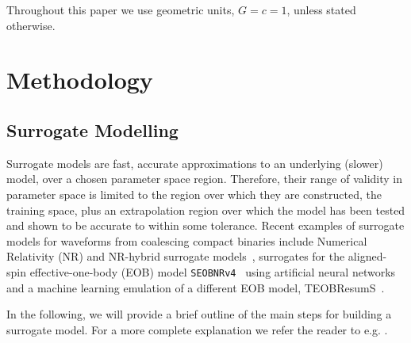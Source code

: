 \documentclass[prd,amssymb,amsmath,amsfonts,superscriptaddress,nofootinbib,reprint,showpacs, longbibliography]{revtex4-1}
\begin{document}
Throughout this paper we use geometric units, $G=c=1$, unless stated otherwise.

\section{Methodology}
\label{sec:Methodology}
\subsection{Surrogate Modelling}
\label{subsec:SurrogateModelling}
Surrogate models are fast, accurate approximations to an underlying (slower) model, over a chosen parameter space region. Therefore, their range of validity in parameter space is limited to the region over which they are constructed, the training space, plus an extrapolation region over which the model has been tested and shown to be accurate to within some tolerance. Recent examples of surrogate models for waveforms from coalescing compact binaries include Numerical Relativity (NR) and NR-hybrid surrogate models~\cite{Blackman:2015pia, Blackman:2017dfb, Varma:2018mmi,Varma:2019csw, Islam:2021mha, Islam:2022laz}, surrogates for the aligned-spin effective-one-body (EOB) model \texttt{SEOBNRv4}~\cite{Bohe:2016gbl} using artificial neural networks \cite{Khan:2020fso,Fragkouli:2022lpt} and a machine learning emulation of a different EOB model, TEOBResumS~\cite{Nagar:2018zoe, Schmidt:2020yuu}. 

In the following, we will provide a brief outline of the main steps for building a surrogate model. For a more complete explanation we refer the reader to e.g. \cite{Field:2013cfa}. 
\end{document}
